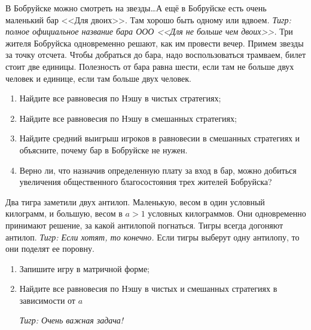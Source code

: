 \begin{problem}
\begin{source}
\cite[4.15]{gintis:gte}
\end{source}
В Бобруйске можно смотреть на звезды\ldots А ещё в Бобруйске есть очень маленький бар <<Для двоих>>. Там хорошо быть одному или вдвоем{\it. Тигр: полное официальное название бара ООО <<Для не больше чем двоих>>.} Три жителя Бобруйска одновременно решают, как им провести вечер. Примем звезды за точку отсчета. Чтобы добраться до бара, надо воспользоваться трамваем, билет стоит две единицы. Полезность от бара равна шести, если там не больше двух человек и единице, если там больше двух человек.\par
\begin{enumerate}
\item  Найдите все равновесия по Нэшу в чистых стратегиях;\par
\item Найдите все равновесия по Нэшу в смешанных стратегиях;\par
\item  Найдите средний выигрыш игроков в равновесии в смешанных стратегиях и объясните, почему бар в Бобруйске не нужен.\par
\item Верно ли, что назначив определенную плату за вход в бар, можно добиться увеличения общественного благосостояния трех жителей Бобруйска?
\end{enumerate}


\begin{sol}

\end{sol}
\end{problem}






\begin{problem}
Два тигра заметили двух антилоп. Маленькую, весом в один условный килограмм, и большую, весом в  $a>1$  условных килограммов. Они одновременно принимают решение, за какой антилопой погнаться. Тигры всегда догоняют антилоп. {\it Тигр: Если хотят, то конечно.} Если тигры выберут одну антилопу, то они поделят ее поровну.\par
\begin{enumerate}
\item Запишите игру в матричной форме;\par
\item Найдите все равновесия по Нэшу в чистых и смешанных стратегиях в зависимости от  $a$\par
{\it Тигр: Очень важная задача!}\par
\end{enumerate}


\begin{sol}

\end{sol}
\end{problem}

